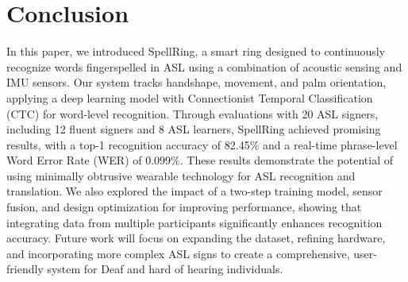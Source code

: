 \section{Conclusion}
In this paper, we introduced SpellRing, a smart ring designed to continuously recognize words fingerspelled in ASL using a combination of acoustic sensing and IMU sensors. Our system tracks handshape, movement, and palm orientation, applying a deep learning model with Connectionist Temporal Classification (CTC) for word-level recognition. Through evaluations with 20 ASL signers, including 12 fluent signers and 8 ASL learners, SpellRing achieved promising results, with a top-1 recognition accuracy of 82.45\% and a real-time phrase-level Word Error Rate (WER) of 0.099\%. These results demonstrate the potential of using minimally obtrusive wearable technology for ASL recognition and translation. We also explored the impact of a two-step training model, sensor fusion, and design optimization for improving performance, showing that integrating data from multiple participants significantly enhances recognition accuracy. Future work will focus on expanding the dataset, refining hardware, and incorporating more complex ASL signs to create a comprehensive, user-friendly system for Deaf and hard of hearing individuals.
